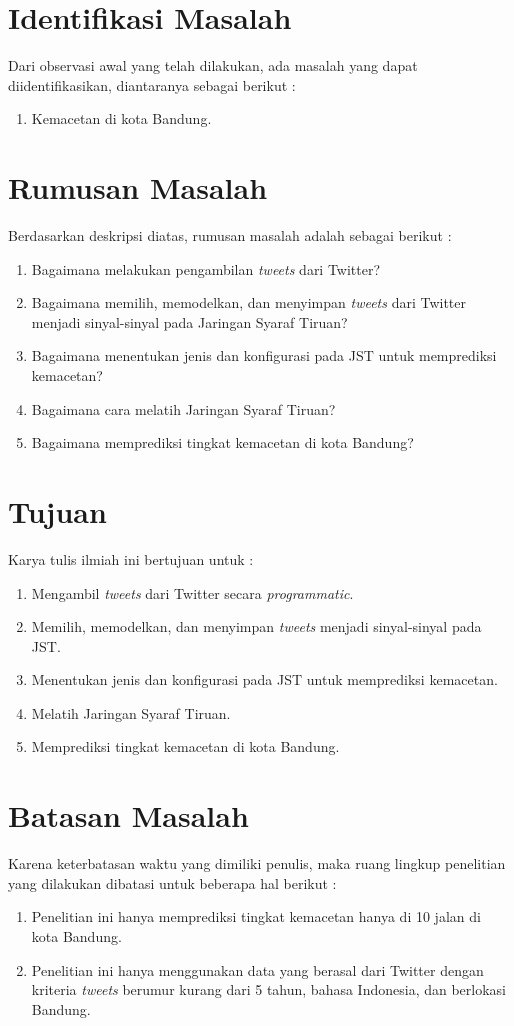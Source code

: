 \section{Identifikasi Masalah}
Dari observasi awal yang telah dilakukan, ada masalah yang dapat diidentifikasikan, diantaranya sebagai berikut :
\begin{enumerate}
	\item Kemacetan di kota Bandung.
\end{enumerate}
\section{Rumusan Masalah}
Berdasarkan deskripsi diatas, rumusan masalah adalah sebagai berikut :
\begin{enumerate}
	\item Bagaimana melakukan pengambilan \textit{tweets} dari Twitter?
	\item Bagaimana memilih, memodelkan, dan menyimpan \textit{tweets} dari Twitter menjadi sinyal-sinyal pada Jaringan Syaraf Tiruan?
	\item Bagaimana menentukan jenis dan konfigurasi pada JST untuk memprediksi kemacetan?
	\item Bagaimana cara melatih Jaringan Syaraf Tiruan?
	\item Bagaimana memprediksi tingkat kemacetan di kota Bandung?
\end{enumerate}
\section{Tujuan}
Karya tulis ilmiah ini bertujuan untuk :
\begin{enumerate}
	\item Mengambil \textit{tweets} dari Twitter secara \textit{programmatic}.
	\item Memilih, memodelkan, dan menyimpan \textit{tweets} menjadi sinyal-sinyal pada JST.
	\item Menentukan jenis dan konfigurasi pada JST untuk memprediksi kemacetan.
	\item Melatih Jaringan Syaraf Tiruan.
	\item Memprediksi tingkat kemacetan di kota Bandung.
\end{enumerate}
\section{Batasan Masalah}
Karena keterbatasan waktu yang dimiliki penulis, maka ruang lingkup penelitian yang dilakukan dibatasi untuk beberapa hal berikut :
\begin{enumerate}
	\item Penelitian ini hanya memprediksi tingkat kemacetan hanya di 10 jalan di kota Bandung.
	\item Penelitian ini hanya menggunakan data yang berasal dari Twitter dengan kriteria \textit{tweets} berumur kurang dari 5 tahun, bahasa Indonesia, dan berlokasi Bandung.
\end{enumerate}
